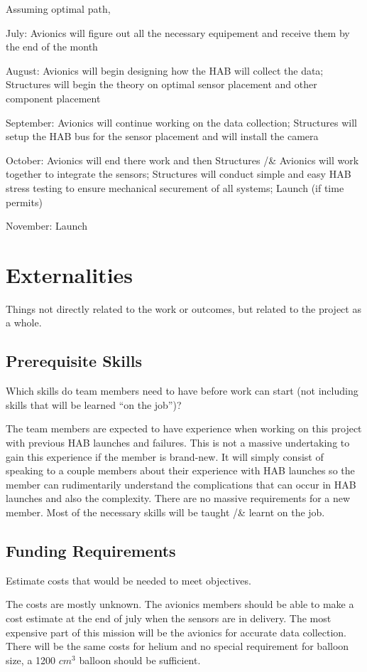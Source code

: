 \documentclass[journal]{SPEXformat}
\newenvironment{help}{
  \ttfamily\footnotesize\sloppy
  \begin{lrbox}{\helpbox}\begin{minipage}{\linewidth}
  }{
  \end{minipage}\end{lrbox}
  \ifbool{showhelp}{
    \fbox{\usebox{\helpbox}}
  }{}
}
\begin{document}
  Assuming optimal path,

  July: Avionics will figure out all the necessary equipement and receive them by the end of the month

  August: Avionics will begin designing how the HAB will collect the data; Structures will begin the theory on optimal sensor placement
  and other component placement

  September: Avionics will continue working on the data collection; Structures will setup the HAB bus for the sensor placement and will
  install the camera

  October: Avionics will end there work and then Structures /& Avionics will work together to integrate the sensors; Structures will conduct
  simple and easy HAB stress testing to ensure mechanical securement of all systems; Launch (if time permits)

  November: Launch
\section{Externalities}
\begin{help}
  Things not directly related to the work or outcomes, but related to the project as a whole.
\end{help}

\subsection{Prerequisite Skills}
\begin{help}
  Which skills do team members need to have before work can start (not including skills that will be learned ``on the job'')?
\end{help}
  The team members are expected to have experience when working on this project with previous HAB launches and failures. This is not a
  massive undertaking to gain this experience if the member is brand-new. It will simply consist of speaking to a couple members about
  their experience with HAB launches so the member can rudimentarily understand the complications that can occur in HAB launches and also
  the complexity. There are no massive requirements for a new member. Most of the necessary skills will be taught /& learnt on the job.

\subsection{Funding Requirements}
\begin{help}
  Estimate costs that would be needed to meet objectives.
\end{help}
  The costs are mostly unknown. The avionics members should be able to make a cost estimate at the end of july when the sensors are in delivery.
  The most expensive part of this mission will be the avionics for accurate data collection. There will be the same costs for helium and no special
  requirement for balloon size, a 1200 $cm^3$ balloon should be sufficient.
\end{document}
